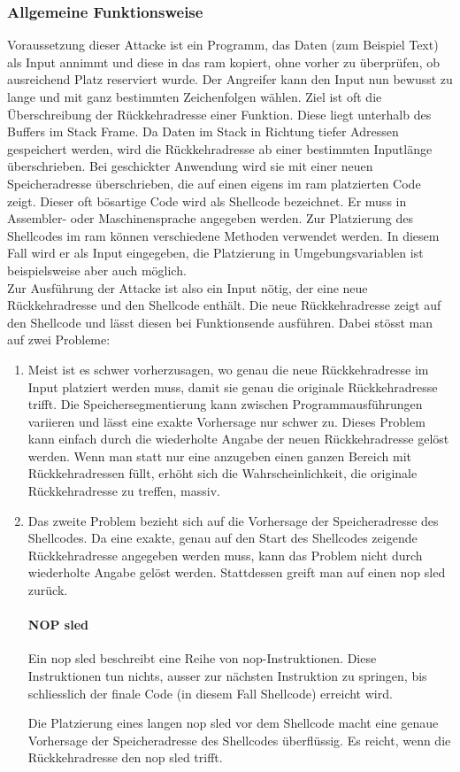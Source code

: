 \documentclass[11pt, a4paper]{article}
\begin{document}
\subsubsection{Allgemeine Funktionsweise}
Voraussetzung dieser Attacke ist ein Programm, das Daten (zum Beispiel Text) als Input annimmt und diese in das \gls{ram} kopiert, ohne vorher zu überprüfen, ob ausreichend Platz reserviert wurde. Der Angreifer kann den Input nun bewusst zu lange und mit ganz bestimmten Zeichenfolgen wählen. Ziel ist oft die Überschreibung der Rückkehradresse einer Funktion. Diese liegt unterhalb des Buffers im Stack Frame. Da Daten im Stack in Richtung tiefer Adressen gespeichert werden, wird die Rückkehradresse ab einer bestimmten Inputlänge überschrieben. Bei geschickter Anwendung wird sie mit einer neuen Speicheradresse überschrieben, die auf einen eigens im \gls{ram} platzierten Code zeigt. Dieser oft bösartige Code wird als Shellcode bezeichnet. Er muss in Assembler- oder Maschinensprache angegeben werden. Zur Platzierung des Shellcodes im \gls{ram} können verschiedene Methoden verwendet werden. In diesem Fall wird er als Input eingegeben, die Platzierung in Umgebungsvariablen ist beispielsweise aber auch möglich. \\Zur Ausführung der Attacke ist also ein Input nötig, der eine neue Rückkehradresse und den Shellcode enthält. Die neue Rückkehradresse zeigt auf den Shellcode und lässt diesen bei Funktionsende ausführen. Dabei stösst man auf zwei Probleme:
\begin{enumerate}
	\item Meist ist es schwer vorherzusagen, wo genau die neue Rückkehradresse im Input platziert werden muss, damit sie genau die originale Rückkehradresse trifft. Die Speichersegmentierung kann zwischen Programmausführungen variieren und lässt eine exakte Vorhersage nur schwer zu. Dieses Problem kann einfach durch die wiederholte Angabe der neuen Rückkehradresse gelöst werden. Wenn man statt nur eine anzugeben einen ganzen Bereich mit Rückkehradressen füllt, erhöht sich die Wahrscheinlichkeit, die originale Rückkehradresse zu treffen, massiv.
	\item Das zweite Problem bezieht sich auf die Vorhersage der Speicheradresse des Shellcodes. Da eine exakte, genau auf den Start des Shellcodes zeigende Rückkehradresse angegeben werden muss, kann das Problem nicht durch wiederholte Angabe gelöst werden. Stattdessen greift man auf einen \gls{nop} sled zurück.
	\paragraph{NOP sled}
	Ein \gls{nop} sled beschreibt eine Reihe von \gls{nop}-Instruktionen. Diese Instruktionen tun nichts, ausser zur nächsten Instruktion zu springen, bis schliesslich der finale Code (in diesem Fall Shellcode) erreicht wird.
	
	Die Platzierung eines langen \gls{nop} sled vor dem Shellcode macht eine genaue Vorhersage der Speicheradresse des Shellcodes überflüssig. Es reicht, wenn die Rückkehradresse den \gls{nop} sled trifft.
\end{enumerate}
\end{document}
